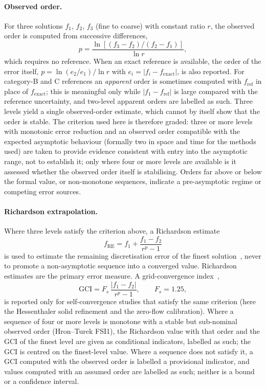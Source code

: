 \paragraph{Observed order.}
For three solutions $f_1$, $f_2$, $f_3$ (fine to coarse) with constant ratio $r$, the observed order is computed from successive differences,
\begin{equation}
	p = \frac{\ln\left[(f_3 - f_2)/(f_2 - f_1)\right]}{\ln r},
	\label{eq:observed_order}
\end{equation}
which requires no reference.
When an exact reference is available, the order of the error itself, $p = \ln(e_2/e_1)/\ln r$ with $e_i = |f_i - f_\mathrm{exact}|$, is also reported.
For category-B and C references an \emph{apparent} order is sometimes computed with $f_\mathrm{ref}$ in place of $f_\mathrm{exact}$; this is meaningful only while $|f_1 - f_\mathrm{ref}|$ is large compared with the reference uncertainty, and two-level apparent orders are labelled as such.
Three levels yield a single observed-order estimate, which cannot by itself show that the order is stable.
The criterion used here is therefore graded: three or more levels with monotonic error reduction and an observed order compatible with the expected asymptotic behaviour (formally two in space and time for the methods used) are taken to provide evidence consistent with entry into the asymptotic range, not to establish it; only where four or more levels are available is it assessed whether the observed order itself is stabilising.
Orders far above or below the formal value, or non-monotone sequences, indicate a pre-asymptotic regime or competing error sources.

\paragraph{Richardson extrapolation.}
Where three levels satisfy the criterion above, a Richardson estimate
\begin{equation}
	f_\mathrm{RE} = f_1 + \frac{f_1 - f_2}{r^{p} - 1}
	\label{eq:richardson}
\end{equation}
is used to estimate the remaining discretisation error of the finest solution~\citep{Richardson1911, Roache1998}, never to promote a non-asymptotic sequence into a converged value.
Richardson estimates are the primary error measure.
A grid-convergence index~\citep{Roache1994, Roache1998},
\begin{equation}
	\mathrm{GCI} = F_s\,\frac{|f_1 - f_2|}{r^{p} - 1}, \qquad F_s = 1.25,
	\label{eq:gci}
\end{equation}
is reported only for self-convergence studies that satisfy the same criterion (here the Hessenthaler solid refinement and the zero-flow calibration). Where a sequence of four or more levels is monotone with a stable but sub-nominal observed order (Hron--Turek FSI1), the Richardson value with that order and the GCI of the finest level are given as conditional indicators, labelled as such; the GCI is centred on the finest-level value.
Where a sequence does not satisfy it, a GCI computed with the observed order is labelled a provisional indicator, and values computed with an assumed order are labelled as such; neither is a bound or a confidence interval.


